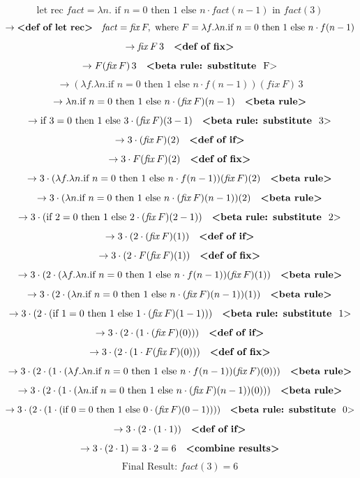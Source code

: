 \documentclass{article}
\theoremstyle{plain}
\theoremstyle{definition}
\theoremstyle{remark}
\begin{document}
\[
\text{let rec } \mathit{fact} = \lambda n. \text{ if } n = 0 \text{ then } 1 \text{ else } n \cdot \mathit{fact}(n-1) \text{ in } \mathit{fact}(3)
\]
\[
\to \text{\textbf{<def of let rec>}} \quad \mathit{fact} = \mathit{fix} \, F, \text{ where } F = \lambda f. \lambda n. \text{if } n = 0 \text{ then } 1 \text{ else } n \cdot f(n-1)
\]
\[
\to \mathit{fix} \, F \, 3 \quad \text{\textbf{<def of fix>}}
\]
\[
\to F(\mathit{fix} \, F) \, 3 \quad \text{\textbf{<beta rule: substitute } F\text{>}}
\]
\[
\to (\lambda f. \lambda n. \text{if } n = 0 \text{ then } 1 \text{ else } n \cdot f(n-1))(\mathit{fix} \, F) \, 3
\]
\[
\to \lambda n. \text{if } n = 0 \text{ then } 1 \text{ else } n \cdot (\mathit{fix} \, F)(n-1) \quad \text{\textbf{<beta rule>}}
\]
\[
\to \text{if } 3 = 0 \text{ then } 1 \text{ else } 3 \cdot (\mathit{fix} \, F)(3-1) \quad \text{\textbf{<beta rule: substitute } 3\text{>}}
\]
\[
\to 3 \cdot (\mathit{fix} \, F)(2) \quad \text{\textbf{<def of if>}}
\]
\[
\to 3 \cdot F(\mathit{fix} \, F)(2) \quad \text{\textbf{<def of fix>}}
\]
\[
\to 3 \cdot (\lambda f. \lambda n. \text{if } n = 0 \text{ then } 1 \text{ else } n \cdot f(n-1))(\mathit{fix} \, F)(2) \quad \text{\textbf{<beta rule>}}
\]
\[
\to 3 \cdot (\lambda n. \text{if } n = 0 \text{ then } 1 \text{ else } n \cdot (\mathit{fix} \, F)(n-1))(2) \quad \text{\textbf{<beta rule>}}
\]
\[
\to 3 \cdot (\text{if } 2 = 0 \text{ then } 1 \text{ else } 2 \cdot (\mathit{fix} \, F)(2-1)) \quad \text{\textbf{<beta rule: substitute } 2\text{>}}
\]
\[
\to 3 \cdot (2 \cdot (\mathit{fix} \, F)(1)) \quad \text{\textbf{<def of if>}}
\]
\[
\to 3 \cdot (2 \cdot F(\mathit{fix} \, F)(1)) \quad \text{\textbf{<def of fix>}}
\]
\[
\to 3 \cdot (2 \cdot (\lambda f. \lambda n. \text{if } n = 0 \text{ then } 1 \text{ else } n \cdot f(n-1))(\mathit{fix} \, F)(1)) \quad \text{\textbf{<beta rule>}}
\]
\[
\to 3 \cdot (2 \cdot (\lambda n. \text{if } n = 0 \text{ then } 1 \text{ else } n \cdot (\mathit{fix} \, F)(n-1))(1)) \quad \text{\textbf{<beta rule>}}
\]
\[
\to 3 \cdot (2 \cdot (\text{if } 1 = 0 \text{ then } 1 \text{ else } 1 \cdot (\mathit{fix} \, F)(1-1))) \quad \text{\textbf{<beta rule: substitute } 1\text{>}}
\]
\[
\to 3 \cdot (2 \cdot (1 \cdot (\mathit{fix} \, F)(0))) \quad \text{\textbf{<def of if>}}
\]
\[
\to 3 \cdot (2 \cdot (1 \cdot F(\mathit{fix} \, F)(0))) \quad \text{\textbf{<def of fix>}}
\]
\[
\to 3 \cdot (2 \cdot (1 \cdot (\lambda f. \lambda n. \text{if } n = 0 \text{ then } 1 \text{ else } n \cdot f(n-1))(\mathit{fix} \, F)(0))) \quad \text{\textbf{<beta rule>}}
\]
\[
\to 3 \cdot (2 \cdot (1 \cdot (\lambda n. \text{if } n = 0 \text{ then } 1 \text{ else } n \cdot (\mathit{fix} \, F)(n-1))(0))) \quad \text{\textbf{<beta rule>}}
\]
\[
\to 3 \cdot (2 \cdot (1 \cdot (\text{if } 0 = 0 \text{ then } 1 \text{ else } 0 \cdot (\mathit{fix} \, F)(0-1)))) \quad \text{\textbf{<beta rule: substitute } 0\text{>}}
\]
\[
\to 3 \cdot (2 \cdot (1 \cdot 1)) \quad \text{\textbf{<def of if>}}
\]
\[
\to 3 \cdot (2 \cdot 1) = 3 \cdot 2 = 6 \quad \text{\textbf{<combine results>}}
\]
\[
\text{Final Result: } \mathit{fact}(3) = 6
\]
\end{document}
